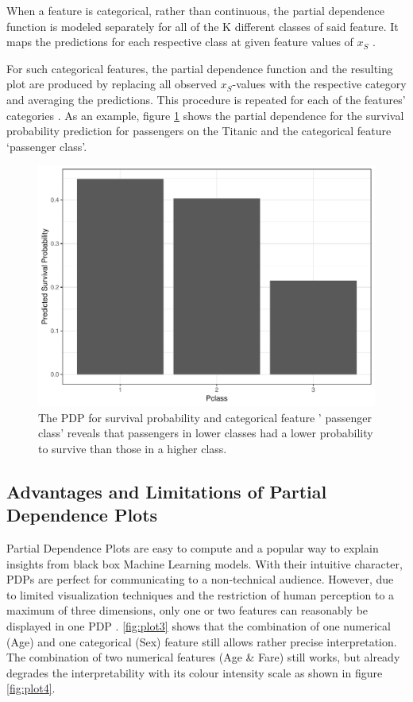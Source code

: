 \documentclass[]{krantz}
\begin{document}
When a feature is categorical, rather than continuous, the partial
dependence function is modeled separately for all of the K different
classes of said feature. It maps the predictions for each respective
class at given feature values of \(x_S\) \citep{hastie2013elements}.

For such categorical features, the partial dependence function and the
resulting plot are produced by replacing all observed \(x_S\)-values
with the respective category and averaging the predictions. This
procedure is repeated for each of the features' categories
\citep{molnar2019}. As an example, figure \ref{fig:plot2} shows the
partial dependence for the survival probability prediction for
passengers on the Titanic and the categorical feature `passenger class'.

\begin{figure}

{\centering \includegraphics[width=0.8\linewidth]{images/PDP_Plot_2} 

}

\caption{The PDP for survival probability and categorical feature ' passenger class' reveals that passengers in lower classes had a lower probability to survive than those in a higher class.}\label{fig:plot2}
\end{figure}

\subsection{Advantages and Limitations of Partial Dependence
Plots}\label{advantages-and-limitations-of-partial-dependence-plots}

Partial Dependence Plots are easy to compute and a popular way to
explain insights from black box Machine Learning models. With their
intuitive character, PDPs are perfect for communicating to a
non-technical audience. However, due to limited visualization techniques
and the restriction of human perception to a maximum of three
dimensions, only one or two features can reasonably be displayed in one
PDP \citep{molnar2019}. \ref{fig:plot3} shows that the combination of
one numerical (Age) and one categorical (Sex) feature still allows
rather precise interpretation. The combination of two numerical features
(Age \& Fare) still works, but already degrades the interpretability
with its colour intensity scale as shown in figure \ref{fig:plot4}.
\end{document}
